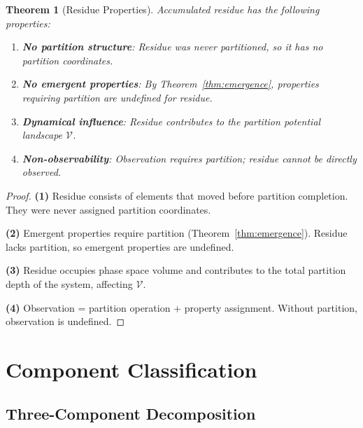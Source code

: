 \documentclass[twocolumn,10pt,a4paper]{article}
\newtheorem{theorem}{Theorem}[section]
\theoremstyle{definition}
\theoremstyle{remark}
\newcommand{\Potential}{\mathcal{V}}
\begin{document}
\begin{theorem}[Residue Properties]
\label{thm:residue_props}
Accumulated residue has the following properties:
\begin{enumerate}
    \item \textbf{No partition structure}: Residue was never partitioned, so it has no partition coordinates.
    \item \textbf{No emergent properties}: By Theorem~\ref{thm:emergence}, properties requiring partition are undefined for residue.
    \item \textbf{Dynamical influence}: Residue contributes to the partition potential landscape $\Potential$.
    \item \textbf{Non-observability}: Observation requires partition; residue cannot be directly observed.
\end{enumerate}
\end{theorem}

\begin{proof}
\textbf{(1)} Residue consists of elements that moved before partition completion. They were never assigned partition coordinates.

\textbf{(2)} Emergent properties require partition (Theorem~\ref{thm:emergence}). Residue lacks partition, so emergent properties are undefined.

\textbf{(3)} Residue occupies phase space volume and contributes to the total partition depth of the system, affecting $\Potential$.

\textbf{(4)} Observation = partition operation + property assignment. Without partition, observation is undefined.
\end{proof}

\section{Component Classification}
\label{sec:components}

\subsection{Three-Component Decomposition}
\end{document}
